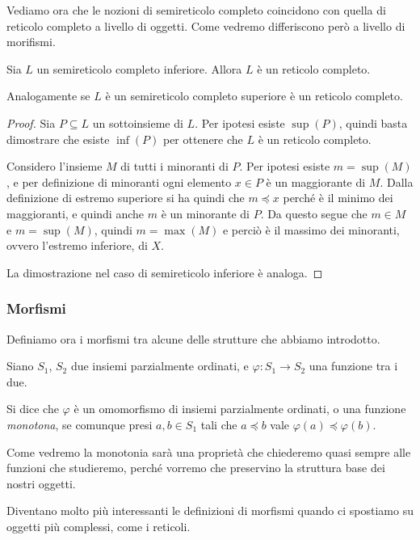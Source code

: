 \documentclass[12pt]{article}
\numberwithin{theorem}{subsection}
\begin{document}
Vediamo ora che le nozioni di semireticolo completo coincidono con quella di reticolo completo a livello di oggetti. Come vedremo differiscono però a livello di morifismi.

\begin{prop}\label{th:complete-semilattice-to-complete-lattice}
	Sia $L$ un semireticolo completo inferiore. Allora $L$ è un reticolo completo.
	
	Analogamente se $L$ è un semireticolo completo superiore è un reticolo completo.
\end{prop}
\begin{proof}
	Sia $P \subseteq L$ un sottoinsieme di $L$. Per ipotesi esiste $\sup(P)$, quindi basta dimostrare che esiste $\inf(P)$ per ottenere che $L$ è un reticolo completo.
	
	Considero l'insieme $M$ di tutti i minoranti di $P$. Per ipotesi esiste $m = \sup(M)$, e per definizione di minoranti ogni elemento $x \in P$ è un maggiorante di $M$. Dalla definizione di estremo superiore si ha quindi che $m \preceq x$ perché è il minimo dei maggioranti, e quindi anche $m$ è un minorante di $P$. Da questo segue che $m \in M$ e $m = \sup(M)$, quindi $m = \max(M)$ e perciò è il massimo dei minoranti, ovvero l'estremo inferiore, di $X$.
	
	La dimostrazione nel caso di semireticolo inferiore è analoga.
\end{proof}

\subsubsection{Morfismi}
Definiamo ora i morfismi tra alcune delle strutture che abbiamo introdotto.

\begin{definition}
	Siano $S_1$, $S_2$ due insiemi parzialmente ordinati, e $\varphi : S_1 \rightarrow S_2$ una funzione tra i due.
	
	Si dice che $\varphi$ è un omomorfismo di insiemi parzialmente ordinati, o una funzione \textit{monotona}, se comunque presi $a, b \in S_1$ tali che $a \preceq b$ vale $\varphi(a) \preceq \varphi(b)$.
\end{definition}

Come vedremo la monotonia sarà una proprietà che chiederemo quasi sempre alle funzioni che studieremo, perché vorremo che preservino la struttura base dei nostri oggetti.

Diventano molto più interessanti le definizioni di morfismi quando ci spostiamo su oggetti più complessi, come i reticoli.
\end{document}

